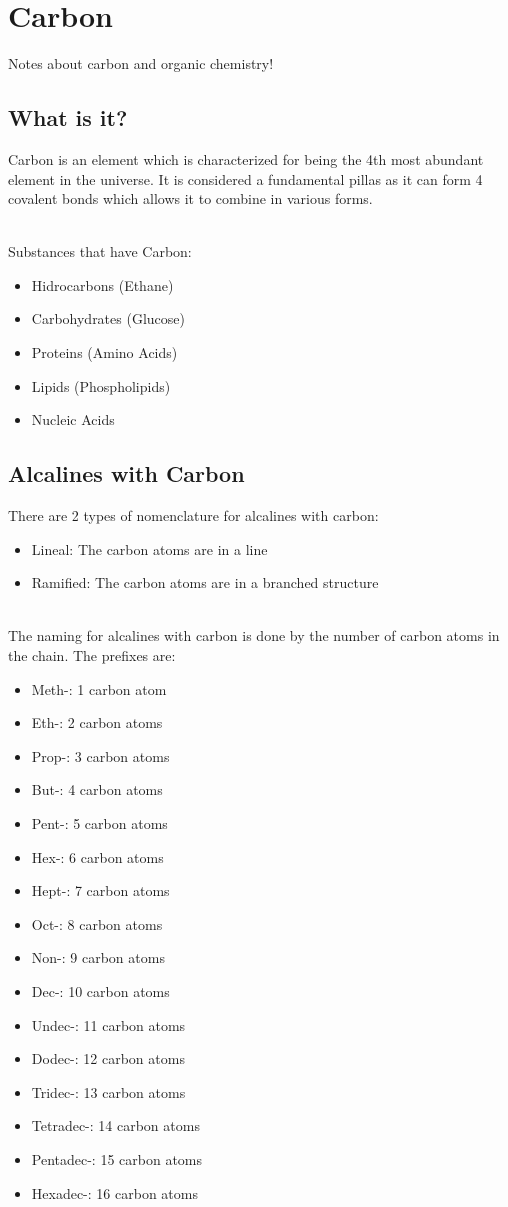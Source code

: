 \section{Carbon}
Notes about carbon and organic chemistry!
\subsection{What is it?}
Carbon is an element which is characterized for being the 4th most abundant element in the universe. It is considered a fundamental pillas as it can form 4 covalent bonds which allows it to combine in various forms.

\,\\
Substances that have Carbon:
\begin{itemize}
    \item Hidrocarbons (Ethane)
    \item Carbohydrates (Glucose)
    \item Proteins (Amino Acids)
    \item Lipids (Phospholipids)
    \item Nucleic Acids
\end{itemize}
\subsection{Alcalines with Carbon}
There are 2 types of nomenclature for alcalines with carbon:
\begin{itemize}
    \item Lineal: The carbon atoms are in a line
    \item Ramified: The carbon atoms are in a branched structure
\end{itemize}

\,\\
The naming for alcalines with carbon is done by the number of carbon atoms in the chain. The prefixes are:
\begin{itemize}
    \item Meth-: 1 carbon atom
    \item Eth-: 2 carbon atoms
    \item Prop-: 3 carbon atoms
    \item But-: 4 carbon atoms
    \item Pent-: 5 carbon atoms
    \item Hex-: 6 carbon atoms
    \item Hept-: 7 carbon atoms
    \item Oct-: 8 carbon atoms
    \item Non-: 9 carbon atoms
    \item Dec-: 10 carbon atoms
    \item Undec-: 11 carbon atoms
    \item Dodec-: 12 carbon atoms
    \item Tridec-: 13 carbon atoms
    \item Tetradec-: 14 carbon atoms
    \item Pentadec-: 15 carbon atoms
    \item Hexadec-: 16 carbon atoms
\end{itemize}

